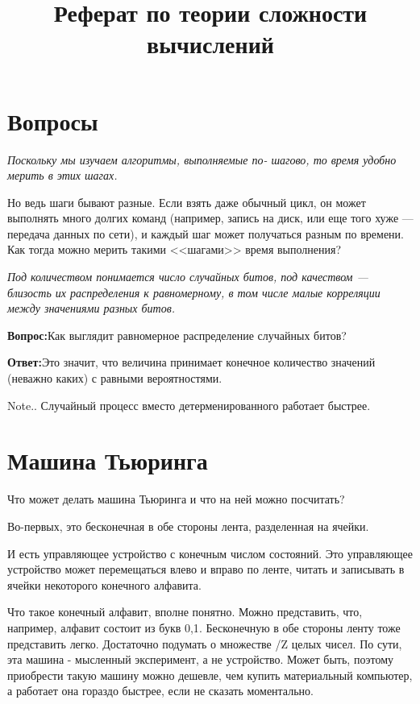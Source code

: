 \documentclass{article}
\title{Реферат по теории сложности вычислений}
\newcommand{\qu}{\textbf{Вопрос:}}
\newcommand{\an}{\textbf{Ответ:}}
\begin{document}
\maketitle

\tableofcontents

\section{Вопросы}

\textit{Поскольку мы изучаем алгоритмы, выполняемые по- шагово, то время удобно мерить в этих шагах.}

Но ведь шаги бывают разные. Если взять даже обычный цикл, он может выполнять много долгих команд (например, запись на диск, или еще того хуже --- передача данных по сети), и каждый шаг может получаться разным по времени. Как тогда можно мерить такими <<шагами>> время выполнения?

\textit{Под количеством понимается число случайных битов, под качеством --- близость их распределения к равномерному, в том числе малые корреляции между значениями разных битов.}

\qu Как выглядит равномерное распределение случайных битов?

\an Это значит, что величина принимает конечное количество значений (неважно каких) с равными вероятностями.


Note.. Случайный процесс вместо детерменированного работает быстрее.

\section{Машина Тьюринга}
Что может делать машина Тьюринга и что на ней можно посчитать?

Во-первых, это бесконечная в обе стороны лента, разделенная на ячейки.

И есть управляющее устройство с конечным числом состояний. 
Это управляющее устройство может перемещаться влево и вправо по ленте, читать и записывать в ячейки некоторого конечного алфавита.

Что такое конечный алфавит, вполне понятно. Можно представить, что, например, алфавит состоит из букв {0,1}. 
Бесконечную в обе стороны ленту тоже представить легко. Достаточно подумать о множестве /Z целых чисел.
По сути, эта машина - мысленный эксперимент, а не устройство. 
Может быть, поэтому приобрести такую машину можно дешевле, чем купить материальный компьютер, а работает она гораздо быстрее, если не сказать моментально.
\end{document}
